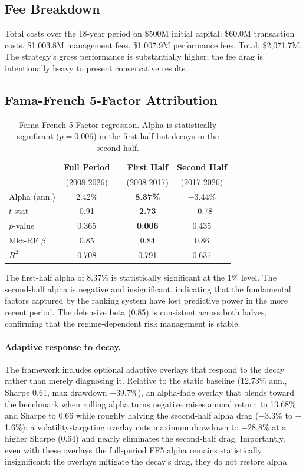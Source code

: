 \documentclass[11pt]{article}
\begin{document}
\subsection{Fee Breakdown}
Total costs over the 18-year period on \$500M initial capital: \$60.0M transaction costs, \$1,003.8M management fees, \$1,007.9M performance fees. Total: \$2,071.7M. The strategy's gross performance is substantially higher; the fee drag is intentionally heavy to present conservative results.

\subsection{Fama-French 5-Factor Attribution}

\begin{table}[H]
\centering
\begin{tabular}{lcccc}
\toprule
& \textbf{Full Period} & & \textbf{First Half} & \textbf{Second Half} \\
& (2008-2026) & & (2008-2017) & (2017-2026) \\
\midrule
Alpha (ann.) & 2.42\% & & \textbf{8.37\%} & $-$3.44\% \\
$t$-stat & 0.91 & & \textbf{2.73} & $-$0.78 \\
$p$-value & 0.365 & & \textbf{0.006} & 0.435 \\
Mkt-RF $\beta$ & 0.85 & & 0.84 & 0.86 \\
$R^2$ & 0.708 & & 0.791 & 0.637 \\
\bottomrule
\end{tabular}
\caption{Fama-French 5-Factor regression. Alpha is statistically significant ($p = 0.006$) in the first half but decays in the second half.}
\end{table}

The first-half alpha of 8.37\% is statistically significant at the 1\% level. The second-half alpha is negative and insignificant, indicating that the fundamental factors captured by the ranking system have lost predictive power in the more recent period. The defensive beta (0.85) is consistent across both halves, confirming that the regime-dependent risk management is stable.

\paragraph{Adaptive response to decay.} The framework includes optional adaptive overlays that respond to the decay rather than merely diagnosing it. Relative to the static baseline (12.73\% ann., Sharpe 0.61, max drawdown $-$39.7\%), an alpha-fade overlay that blends toward the benchmark when rolling alpha turns negative raises annual return to 13.68\% and Sharpe to 0.66 while roughly halving the second-half alpha drag ($-$3.3\% to $-$1.6\%); a volatility-targeting overlay cuts maximum drawdown to $-$28.8\% at a higher Sharpe (0.64) and nearly eliminates the second-half drag. Importantly, even with these overlays the full-period FF5 alpha remains statistically insignificant: the overlays mitigate the decay's drag, they do not restore alpha.
\end{document}
